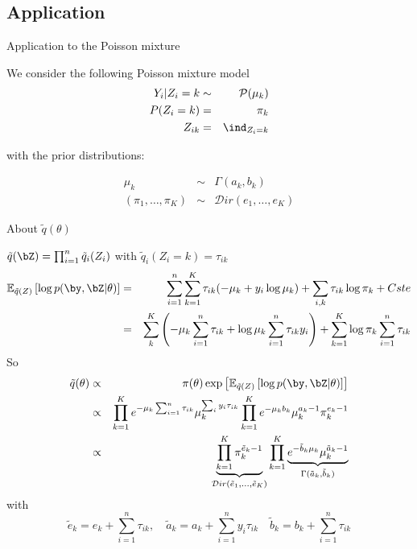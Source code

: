 
\subsection{Application}
\begin{frame}{Application to the Poisson mixture}

We consider the following  Poisson mixture model
\begin{eqnarray*}
Y_{i} | Z_i = k &\sim& \mathcal{P}(\mu_k)\\
P(Z_i = k) &=&  \pi_k\\ 
Z_{ik} &=& \ind_{Z_i=k}
\end{eqnarray*}

with the prior distributions: 

\begin{eqnarray*}
\mu_k &\sim& \Gamma(a_k,b_k)\\
(\pi_1, \dots, \pi_K) &\sim& \mathcal{D}ir(e_1, \dots, e_K)
\end{eqnarray*}

  
  
 \end{frame} 



\begin{frame}{About $\tilde{q}(\theta)$}

{\footnotesize 
$\tilde{q}(\bZ) = \prod_{i=1}^n \tilde{q}_i(Z_i)$
with $\tilde{q}_i(Z_i=k) = \tau_{ik}$
\begin{eqnarray*}
\mathbb{E}_{\tilde{q}(Z)}\left[\log p(\by,\bZ | \theta) \right]&=& \sum_{i=1}^n \sum_{k=1}^K \tau_{ik}(-\mu_k + y_i \log \mu_k) +  \sum_{i,k} \tau_{ik} \log \pi_k + Cste\\
&=& \sum_{k}^K \left(-\mu_k \sum_{i=1}^n  \tau_{ik} + \log \mu_k \sum_{i=1}^n  \tau_{ik} y_i \right)+ \sum_{k=1}^K \log \pi_k \sum_{i=1}^n \tau_{ik} 
\end{eqnarray*}
So
\begin{eqnarray*}
\tilde{q}(\theta) &\propto& \pi(\theta) \exp \left[\mathbb{E}_{\tilde{q}(Z)}\left[\log p(\by,\bZ | \theta) \right]\right] \\
&\propto& \prod_{k=1}^K e^{-\mu_k \sum_{i=1}^n \tau_{ik} }\mu_k^{\sum_i y_i \tau_{ik}} \prod_{k=1}^K e^{-\mu_k b_k} \mu_k^{a_k-1} \pi_k ^{e_k-1}\\
&\propto& \underbrace{\prod_{k=1}^K \pi_k ^{\tilde{e}_k-1}}_{\mathcal{D}ir(\tilde{e}_1, \dots,\tilde{e}_K)} \prod_{k=1}^K  \underbrace{e^{-\tilde{b}_k \mu_k}  \mu_k^{\tilde{a}_k-1}}_{\Gamma(\tilde a_k, \tilde b_k)}
\end{eqnarray*}
with $$\tilde{e}_k = e_k + \sum_{i=1}^n \tau_{ik},\quad \tilde{a}_k  = a_k + \sum_{i=1}^ny_{i} \tau_{ik}\quad \tilde{b}_k  = b_k + \sum_{i=1}^n   \tau_{ik} $$ 
}

\end{frame}

